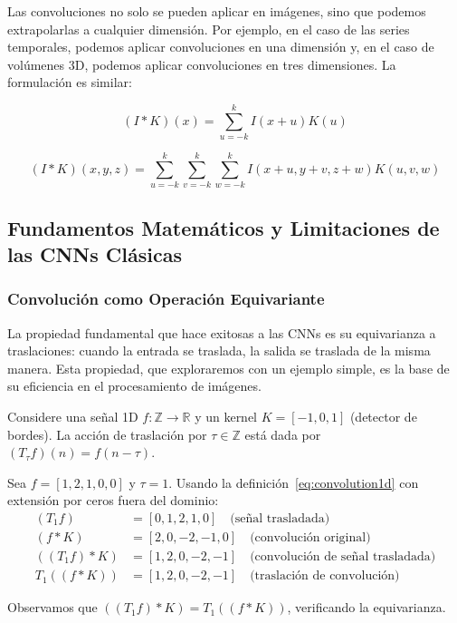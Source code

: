 Las convoluciones no solo se pueden aplicar en imágenes, sino que podemos extrapolarlas a cualquier dimensión. Por ejemplo, en el caso de las series temporales, podemos aplicar convoluciones en una dimensión y, en el caso de volúmenes 3D, podemos aplicar convoluciones en tres dimensiones. La formulación es similar:

\begin{equation}
    (I * K)(x) = \sum_{u=-k}^{k} I(x+u)K(u)
    \label{eq:convolution1d}
\end{equation}

\begin{equation}
    (I * K)(x,y,z) = \sum_{u=-k}^{k}\sum_{v=-k}^{k}\sum_{w=-k}^{k} I(x+u, y+v, z+w)K(u,v,w)
    \label{eq:convolution3d}
\end{equation}

\subsection{Fundamentos Matemáticos y Limitaciones de las CNNs Clásicas}\label{subsec:fundamentos_limitaciones_cnn}

\subsubsection{Convolución como Operación Equivariante}\label{subsubsec:convolucion_equivariante}

La propiedad fundamental que hace exitosas a las \glspl{CNN} es su equivarianza a traslaciones: cuando la entrada se traslada, la salida se traslada de la misma manera. Esta propiedad, que exploraremos con un ejemplo simple, es la base de su eficiencia en el procesamiento de imágenes.

\begin{example}\label{ex:equivarianza_traslaciones_1d}
Considere una señal 1D $f: \mathbb{Z} \to \mathbb{R}$ y un kernel $K = [-1, 0, 1]$ (detector de bordes). 
La acción de traslación por $\tau \in \mathbb{Z}$ está dada por $(T_\tau f)(n) = f(n-\tau)$.

Sea $f = [1, 2, 1, 0, 0]$ y $\tau = 1$. Usando la definición~\eqref{eq:convolution1d} con extensión por ceros fuera del dominio:
\begin{align}
(T_1 f) &= [0, 1, 2, 1, 0] \quad \text{(señal trasladada)} \\
(f * K) &= [2, 0, -2, -1, 0] \quad \text{(convolución original)} \\
((T_1 f) * K) &= [1, 2, 0, -2, -1] \quad \text{(convolución de señal trasladada)} \\
T_1((f * K)) &= [1, 2, 0, -2, -1] \quad \text{(traslación de convolución)}
\end{align}

Observamos que $((T_1 f) * K) = T_1((f * K))$, verificando la equivarianza.
\end{example}

